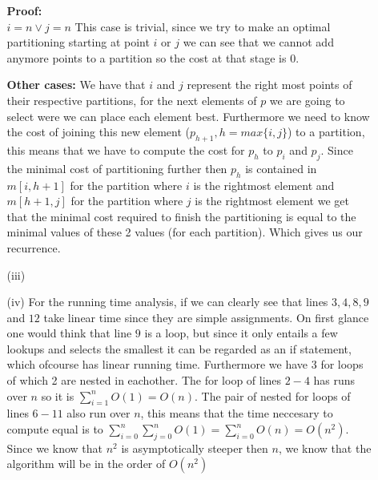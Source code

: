 \documentclass{article}
\begin{document}
\begin{itemize}
\begin{itemize}
\textbf{Proof:}\\
\textbf{$i=n \vee j=n$} This case is trivial, since we try to make an optimal partitioning starting at point $i$ or $j$ we can see that we cannot add anymore points to a partition so the cost at that stage is $0$.

\textbf{Other cases:} We have that $i$ and $j$ represent the right most points of their respective partitions, for the next elements of $p$ we are going to select were we can place each element best. Furthermore we need to know the cost of joining this new element ($p_{h+1}, h=max\{i,j\}$) to a partition, this means that we have to compute the cost for $p_h$ to $p_i$ and $p_j$. Since the minimal cost of partitioning further then $p_h$ is contained in $m[i,h+1]$ for the partition where $i$ is the rightmost element and $m[h+1,j]$ for the partition where $j$ is the rightmost element we get that the minimal cost required to finish the partitioning is equal to the minimal values of these 2 values (for each partition). Which gives us our recurrence.
\item[(iii)] 
\begin{algorithmic}[1]
\ENDFOR
{}
	\ENDFOR
\ENDFOR
{}
\end{algorithmic}

\item[(iv)] For the running time analysis, if we can clearly see that lines $3,4,8,9$ and $12$ take linear time since they are simple assignments. On first glance one would think that line $9$ is a loop, but since it only entails a few lookups and selects the smallest it can be regarded as an if statement, which ofcourse has linear running time. Furthermore we have 3 for loops of which 2 are nested in eachother. The for loop of lines $2-4$ has runs over $n$ so it is $\sum_{i=1}^n{O(1)}=O(n)$. The pair of nested for loops of lines $6-11$ also run over $n$, this means that the time neccesary to compute equal is to $\sum_{i=0}^n{\sum_{j=0}^n{O(1)}}=\sum_{i=0}^n{O(n)}=O(n^2)$. Since we know that $n^2$ is asymptotically steeper then $n$, we know that the algorithm will be in the order of $O(n^2)$

\end{itemize}
\end{itemize}
\end{document}
